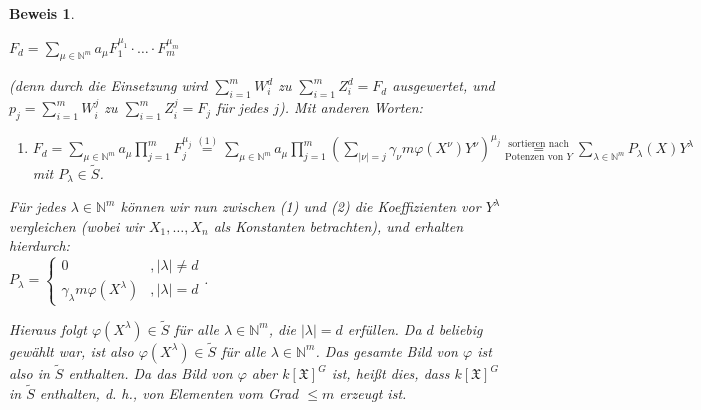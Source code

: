 \documentclass[a4paper,12pt]{scrbook}
\theoremstyle{break}
\theoremstyle{nonumberbreak}
\newtheorem{Bew}{Beweis}
\theoremstyle{nonumberplain}
\begin{document}
\begin{Bew}
\begin{enumerate}
      $F_d = \sum_{\mu \in \mathbb{N}^m} a_{\mu} F_1^{\mu_1} \cdot \dots \cdot F_m^{\mu_m}$
      
      (denn durch die Einsetzung wird $\sum_{i=1}^m W_i^d$ zu $\sum_{i=1}^m Z_i^d = F_d$
      ausgewertet, und $p_j = \sum_{i=1}^m W_i^j$ zu $\sum_{i=1}^m Z_i^j = F_j$ für jedes $j$).
      Mit anderen Worten:
      
    \begin{enumerate}
    \item[(2)] $F_d = \sum_{\mu \in \mathbb{N}^m} a_{\mu} \prod_{j=1}^m F_j^{\mu_j} \overset{(1)}{=} \sum_{\mu \in \mathbb{N}^m} a_{\mu} \prod_{j=1}^m (\sum_{|\nu| = j} \gamma_{\nu} m \varphi (X^{\nu}) Y ^{\nu})^{\mu_j} \overset{\text{sortieren nach}}{\underset{\text{Potenzen von $Y$}}{=}} \sum_{\lambda \in \mathbb{N}^m} P_{\lambda}(X)Y^{\lambda}$ mit $P_{\lambda} \in \tilde{S}$.
    \end{enumerate}

      Für jedes $\lambda \in \mathbb{N}^m$ können wir nun zwischen (1) und (2) die Koeffizienten
      vor $Y^{\lambda}$ vergleichen (wobei wir $X_1, \dots , X_n$ als Konstanten betrachten), und
      erhalten hierdurch:\\
      $P_{\lambda}= \begin{cases} 0 &, |\lambda| \not= d\\ \gamma_{\lambda} m \varphi(X^{\lambda})&, |\lambda|=d \end{cases}$.

      Hieraus folgt $\varphi(X^{\lambda}) \in \tilde{S}$ für alle $\lambda \in \mathbb{N}^m$, die
      $\left|\lambda\right| = d$ erfüllen. Da $d$ beliebig gewählt war, ist also
      $\varphi(X^{\lambda}) \in \tilde{S}$ für alle $\lambda \in \mathbb{N}^m$. Das gesamte Bild
      von $\varphi$ ist also in $\tilde{S}$ enthalten. Da das Bild von $\varphi$ aber
      $k\left[\mathfrak{X}\right]^G$ ist, heißt dies, dass $k\left[\mathfrak{X}\right]^G$ in
      $\tilde{S}$ enthalten, d. h., von Elementen vom Grad $\leq m$ erzeugt ist.
  \end{enumerate}
\end{Bew}
\end{document}
